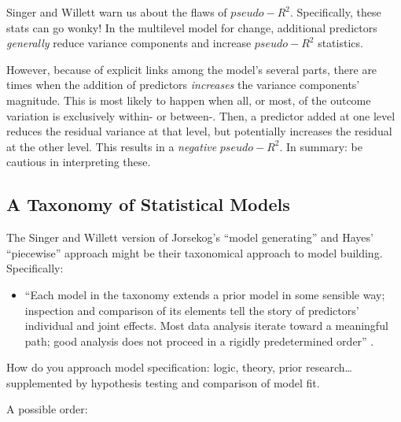 \documentclass[
  11pt,
]{book}
\providecommand{\tightlist}{%
  \setlength{\itemsep}{0pt}\setlength{\parskip}{0pt}}
\begin{document}
Singer and Willett \citeyearpar{singer_applied_2003} warn us about the flaws of \(pseudo-R^2\). Specifically, these stats can go wonky! In the multilevel model for change, additional predictors \emph{generally} reduce variance components and increase \(pseudo-R^2\) statistics.

However, because of explicit links among the model's several parts, there are times when the addition of predictors \emph{increases} the variance components' magnitude. This is most likely to happen when all, or most, of the outcome variation is exclusively within- or between-. Then, a predictor added at one level reduces the residual variance at that level, but potentially increases the residual at the other level. This results in a \emph{negative} \(pseudo-R^2\). In summary: be cautious in interpreting these.

\hypertarget{a-taxonomy-of-statistical-models}{%
\subsection{A Taxonomy of Statistical Models}\label{a-taxonomy-of-statistical-models}}

The Singer and Willett \citeyearpar{singer_applied_2003} version of Jorsekog's \citeyearpar{bollen_testing_1993} ``model generating'' and Hayes' \citeyearpar{hayes_introduction_2018} ``piecewise'' approach might be their taxonomical approach to model building. Specifically:

\begin{itemize}
\tightlist
\item
  ``Each model in the taxonomy extends a prior model in some sensible way; inspection and comparison of its elements tell the story of predictors' individual and joint effects. Most data analysis iterate toward a meaningful path; good analysis does not proceed in a rigidly predetermined order'' \citep[p.~105]{singer_applied_2003}.
\end{itemize}

How do you approach model specification: logic, theory, prior research\ldots supplemented by hypothesis testing and comparison of model fit.

A possible order:
\end{document}
